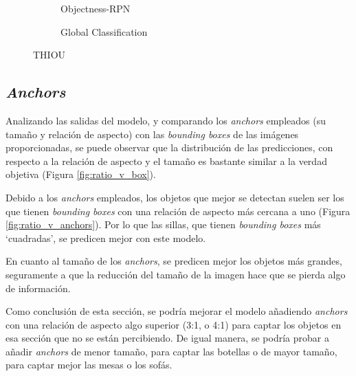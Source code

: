 \begin{figure}[h]
  \centering
  \begin{subfigure}[t]{.5\textwidth}
    
    \caption{Objectness-RPN}
    \label{fig:objectness_TH_IOU}
  \end{subfigure}%
  \begin{subfigure}[t]{.5\textwidth}
    \centering
    
    \caption{Global Classification}
    \label{fig:global_TH_IOU}
  \end{subfigure}
  \caption{TH\textunderscore IOU}
\end{figure}



\subsection{\textit{Anchors}}
    Analizando las salidas del modelo, y comparando los \textit{anchors} empleados
    (su tamaño y relación de aspecto) con las \textit{bounding boxes} de las imágenes proporcionadas,
    se puede observar que la distribución de las predicciones, con respecto a la relación de aspecto
    y el tamaño es bastante similar a la verdad objetiva (Figura \ref{fig:ratio_v_box}).


    Debido a los \textit{anchors} empleados, los objetos que mejor se detectan suelen ser
    los que tienen \textit{bounding boxes} con una relación de aspecto más cercana a uno (Figura \ref{fig:ratio_v_anchors}).
    Por lo que las sillas, que tienen \textit{bounding boxes} más `cuadradas', se predicen mejor con este modelo.


    En cuanto al tamaño de los \textit{anchors}, se predicen mejor los objetos más grandes,
    seguramente a que la reducción del tamaño de la imagen hace que se pierda algo de información.

    Como conclusión de esta sección, se podría mejorar el modelo añadiendo
    \textit{anchors} con una relación de aspecto algo superior (3:1, o 4:1) para captar
    los objetos en esa sección que no se están percibiendo. De igual manera,
    se podría probar a añadir \textit{anchors} de menor tamaño, para captar las botellas o de
    mayor tamaño, para captar mejor las mesas o los sofás.



